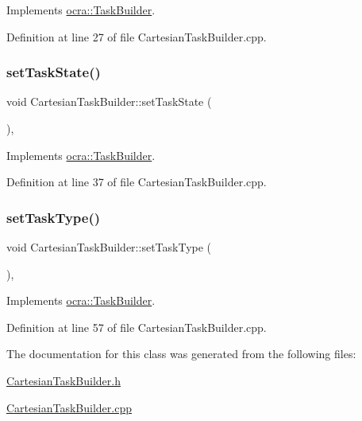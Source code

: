 Implements \hyperlink{classocra_1_1TaskBuilder_a7a2c8bcc5d95160d0e48806a2648f1a5}{ocra\+::\+Task\+Builder}.



Definition at line 27 of file Cartesian\+Task\+Builder.\+cpp.

\hypertarget{classocra_1_1CartesianTaskBuilder_a9e3175e5792c5ed9a7e3febbe458d21c}{}\label{classocra_1_1CartesianTaskBuilder_a9e3175e5792c5ed9a7e3febbe458d21c} 
\subsubsection{\texorpdfstring{set\+Task\+State()}{setTaskState()}}
{\footnotesize\ttfamily void Cartesian\+Task\+Builder\+::set\+Task\+State (\begin{DoxyParamCaption}{ }\end{DoxyParamCaption})\hspace{0.3cm}{\ttfamily [protected]}, {\ttfamily [virtual]}}



Implements \hyperlink{classocra_1_1TaskBuilder_a7b44bfa101566ea4400e2d9bfdb9ff32}{ocra\+::\+Task\+Builder}.



Definition at line 37 of file Cartesian\+Task\+Builder.\+cpp.

\hypertarget{classocra_1_1CartesianTaskBuilder_a679842b95d6f7296a466636fd21bbbb8}{}\label{classocra_1_1CartesianTaskBuilder_a679842b95d6f7296a466636fd21bbbb8} 
\subsubsection{\texorpdfstring{set\+Task\+Type()}{setTaskType()}}
{\footnotesize\ttfamily void Cartesian\+Task\+Builder\+::set\+Task\+Type (\begin{DoxyParamCaption}{ }\end{DoxyParamCaption})\hspace{0.3cm}{\ttfamily [protected]}, {\ttfamily [virtual]}}



Implements \hyperlink{classocra_1_1TaskBuilder_a1a979fc495be6dc30483aa8fd0ff2650}{ocra\+::\+Task\+Builder}.



Definition at line 57 of file Cartesian\+Task\+Builder.\+cpp.



The documentation for this class was generated from the following files\+:\begin{DoxyCompactItemize}
\item 
\hyperlink{CartesianTaskBuilder_8h}{Cartesian\+Task\+Builder.\+h}\item 
\hyperlink{CartesianTaskBuilder_8cpp}{Cartesian\+Task\+Builder.\+cpp}\end{DoxyCompactItemize}
